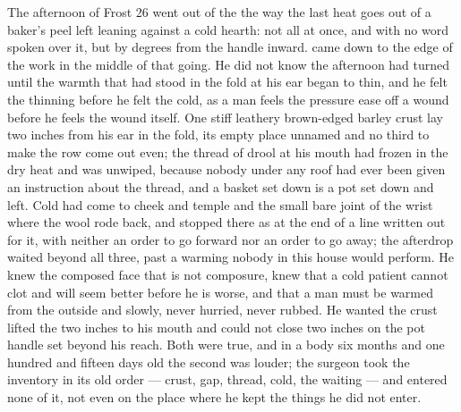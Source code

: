 The afternoon of Frost 26 went out of the  the way the last heat goes out of a baker's peel left leaning against a cold hearth: not all at once, and with no word spoken over it, but by degrees from the handle inward.  came down to the edge of the work in the middle of that going. He did not know the afternoon had turned until the warmth that had stood in the fold at his ear began to thin, and he felt the thinning before he felt the cold, as a man feels the pressure ease off a wound before he feels the wound itself. One stiff leathery brown-edged barley crust lay two inches from his ear in the fold, its empty place unnamed and no third to make the row come out even; the thread of drool at his mouth had frozen in the dry heat and was unwiped, because nobody under any roof had ever been given an instruction about the thread, and a basket set down is a pot set down and left. Cold had come to cheek and temple and the small bare joint of the wrist where the wool rode back, and stopped there as at the end of a line written out for it, with neither an order to go forward nor an order to go away; the afterdrop waited beyond all three, past a warming nobody in this house would perform. He knew the composed face that is not composure, knew that a cold patient cannot clot and will seem better before he is worse, and that a man must be warmed from the outside and slowly, never hurried, never rubbed. He wanted the crust lifted the two inches to his mouth and could not close two inches on the pot handle set beyond his reach. Both were true, and in a body six months and one hundred and fifteen days old the second was louder; the surgeon took the inventory in its old order --- crust, gap, thread, cold, the waiting --- and entered none of it, not even on the place where he kept the things he did not enter.

